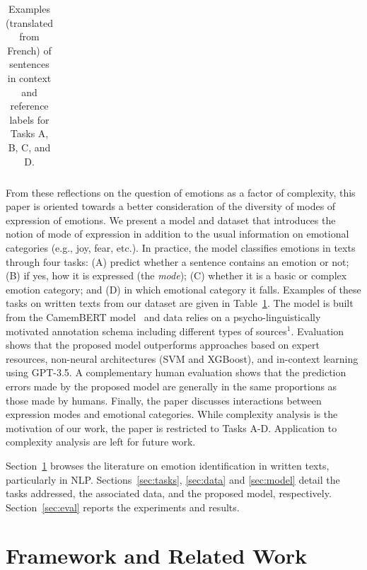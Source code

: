 \begin{table}[t!]
\begin{center}
\begin{tabular}{@{}p{7cm}||@{~}c@{~}||@{}c@{}|@{}c@{}|@{}c@{}|@{}c@{}||@{}c@{}|@{}c@{}||@{}c@{}|@{}c@{}|@{}c@{}|@{}c@{}|@{}c@{}|@{}c@{}|@{}c@{}|@{}c@{}|@{}c@{}|@{}c@{}|@{}c@{}|@{}c@{}|@{}c@{}}
        \end{tabular}
\caption{Examples (translated from French) of sentences in context and reference labels for Tasks A, B, C, and D.}
\label{tab:examples}
\end{center}
\end{table}

From these reflections on the question of emotions as a factor of complexity, this paper is oriented towards a better consideration of the diversity of modes of expression of emotions. We present a model and dataset that introduces the notion of mode of expression in addition to the usual information on emotional categories (e.g., joy, fear, etc.). In practice, the model classifies emotions in texts through four tasks: (A) predict whether a sentence contains an emotion or not; (B) if yes, how it is expressed (the \textit{mode}); (C) whether it is a basic or complex emotion category; and (D) in which emotional category it falls. Examples of these tasks on written texts from our dataset are given in Table~\ref{tab:examples}.
%
The model is built from the CamemBERT model~\citep{martin_camembert_2020} and data relies on a psycho-linguistically motivated annotation schema including different types of sources$^1$.
%
Evaluation shows that the proposed model outperforms approaches based on expert resources, non-neural architectures (SVM and XGBoost), and in-context learning using GPT-3.5.
%
A complementary human evaluation shows that the prediction errors made by the proposed model are generally in the same proportions as those made by humans. Finally, the paper discusses interactions between expression modes and emotional categories.
%
While complexity analysis is the motivation of our work, the paper is restricted to Tasks A-D. Application to complexity analysis are left for future work.


Section~\ref{sec:literature} browses the literature on emotion identification in written texts, particularly in NLP. Sections~\ref{sec:tasks}, \ref{sec:data} and \ref{sec:model} detail the tasks addressed, the associated data, and the proposed model, respectively. Section~\ref{sec:eval} reports the experiments and results.






\section{Framework and Related Work}
\label{sec:literature}

